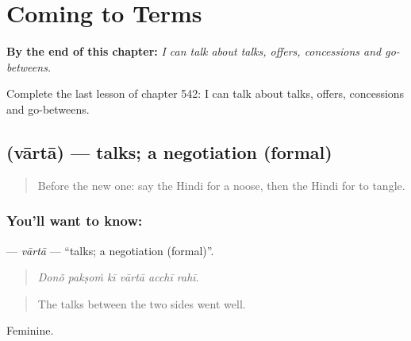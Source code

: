 
\chapter{Coming to Terms}
\label{ch:hi-coming-to-terms}

\begin{chapteropening}
\textbf{By the end of this chapter:} \emph{I can talk about talks, offers, concessions and go-betweens.}

Complete the last lesson of chapter 542: I can talk about talks, offers, concessions and go-betweens.
\end{chapteropening}

\section[\texorpdfstring{\hi{वार्ता} (vārtā)}{वार्ता (vārtā)}]{ (vārtā) — talks; a negotiation (formal)}

\label{lesson:HI-C542-varta}



\begin{quote}
Before the new one: say the Hindi for a noose, then the Hindi for to tangle.
\end{quote}

\subsection*{You'll want to know: }
\textbf{} — \emph{vārtā} — \textquotedblleft{}talks; a negotiation (formal)\textquotedblright{}.

\begin{quote}
     
\end{quote}

\begin{quote}
\emph{Donõ pakṣoṁ kī vārtā acchī rahī.}
\end{quote}

\begin{quote}
The talks between the two sides went well.
\end{quote}

Feminine.

